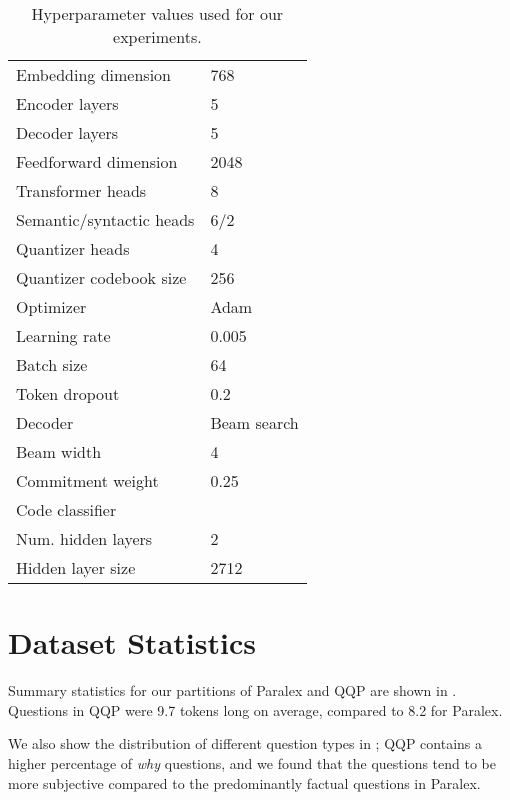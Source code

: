 \documentclass[11pt,a4paper]{article}
\begin{document}
\begin{table}[ht]
    \centering
\small
    \begin{tabular}{l|p{2cm}}
    Embedding dimension  & 768 \\
    Encoder layers & 5 \\
    Decoder layers & 5 \\
    Feedforward dimension & 2048 \\
    Transformer heads & 8 \\
    Semantic/syntactic heads  & 6/2 \\
    Quantizer heads  & 4 \\
    Quantizer codebook size & 256 \\
    Optimizer & Adam \cite{adam} \\
    Learning rate & 0.005 \\
    Batch size & 64 \\
    Token dropout & 0.2 \cite{tokendropout} \\
    Decoder & Beam search \\
    Beam width & 4 \\
    Commitment weight  & 0.25 \\
    \hline
    Code classifier & \\
    Num. hidden layers & 2 \\
    Hidden layer size & 2712 \\
    
    \end{tabular}
    \caption{Hyperparameter values used for our experiments.}
    \label{tab:hyperparams}
\end{table}

\section{Dataset Statistics}
\label{app:dataset}

Summary statistics for our partitions of Paralex and QQP are shown in . Questions in QQP were 9.7 tokens long on average, compared to 8.2 for Paralex.

We also show the distribution of different question types in ; QQP contains a higher percentage of \textit{why} questions, and we found that the questions tend to be more subjective compared to the predominantly factual questions in Paralex.
\end{document}
